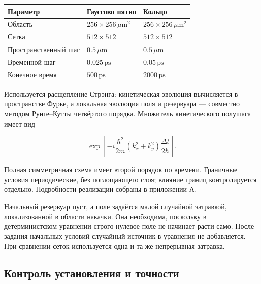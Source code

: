 \documentclass[12pt,a4paper]{article}
\begin{document}
\begin{center}\begin{tabular}{>{\raggedright\arraybackslash}p{}>{\raggedright\arraybackslash}p{}>{\raggedright\arraybackslash}p{}}\toprule

\textbf{Параметр} & \textbf{Гауссово пятно} & \textbf{Кольцо}\\\midrule

Область & $256 \times 256\,\mu\mathrm m^{2}$ & $256 \times 256\,\mu\mathrm m^{2}$\\

Сетка & $512 \times 512$ & $512 \times 512$\\

Пространственный шаг & $0.5\,\mu\mathrm m$ & $0.5\,\mu\mathrm m$\\

Временной шаг & $0.025\,\mathrm{ps}$ & $0.05\,\mathrm{ps}$\\

Конечное время & $500\,\mathrm{ps}$ & $2000\,\mathrm{ps}$\\

\bottomrule\end{tabular}\end{center}

Используется расщепление Стрэнга: кинетическая эволюция вычисляется в пространстве Фурье, а локальная эволюция поля и резервуара --- совместно методом Рунге--Кутты четвёртого порядка. Множитель кинетического полушага имеет вид

\begin{equation}\label{eq:25}
\exp\left[-i\frac{\hbar^2}{2m}(k_x^2+k_y^2)\frac{\Delta t}{2\hbar}\right].\end{equation}

Полная симметричная схема имеет второй порядок по времени. Граничные условия периодические, без поглощающего слоя; влияние границ контролируется отдельно. Подробности реализации собраны в приложении А.

Начальный резервуар пуст, а поле задаётся малой случайной затравкой, локализованной в области накачки. Она необходима, поскольку в детерминистском уравнении строго нулевое поле не начинает расти само. После задания начальных условий случайный источник в уравнения не добавляется. При сравнении сеток используется одна и та же непрерывная затравка.

\subsection{Контроль установления и точности}\label{sec:5.3}
\end{document}
